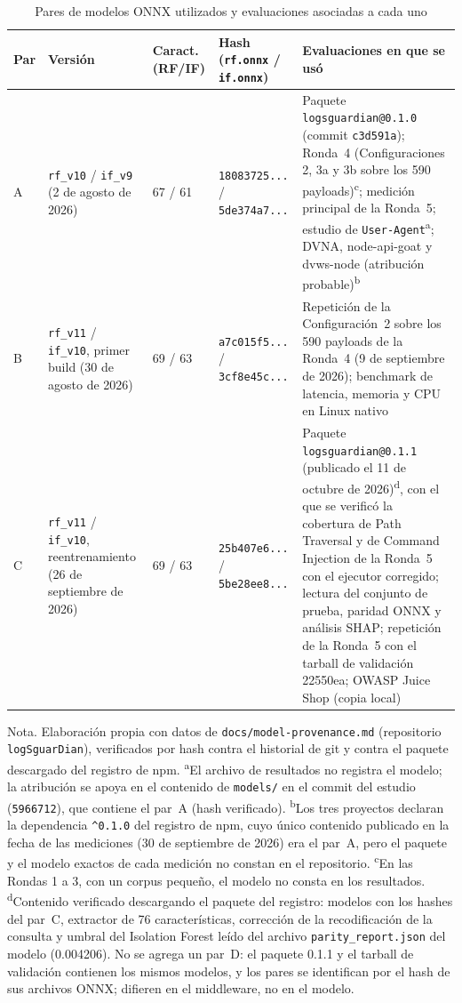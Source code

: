 \begin{table}[H]
\centering
\small
\begin{tabular}{|L{0.9cm}|L{2.6cm}|L{1.4cm}|L{2.6cm}|L{5.2cm}|}
\hline
\textbf{Par} & \textbf{Versión} & \textbf{Caract. (RF/IF)} & \textbf{Hash (\texttt{rf.onnx} / \texttt{if.onnx})} & \textbf{Evaluaciones en que se usó} \\ \hline
A & \texttt{rf\_v10} / \texttt{if\_v9} (2 de agosto de 2026) & 67 / 61 & \texttt{18083725...} / \texttt{5de374a7...} & Paquete \texttt{logsguardian@0.1.0} (commit \texttt{c3d591a}); Ronda~4 (Configuraciones 2, 3a y 3b sobre los 590 payloads)\textsuperscript{c}; medición principal de la Ronda~5; estudio de \texttt{User-Agent}\textsuperscript{a}; DVNA, node-api-goat y dvws-node (atribución probable)\textsuperscript{b} \\ \hline
B & \texttt{rf\_v11} / \texttt{if\_v10}, primer build (30 de agosto de 2026) & 69 / 63 & \texttt{a7c015f5...} / \texttt{3cf8e45c...} & Repetición de la Configuración~2 sobre los 590 payloads de la Ronda~4 (9 de septiembre de 2026); benchmark de latencia, memoria y CPU en Linux nativo \\ \hline
C & \texttt{rf\_v11} / \texttt{if\_v10}, reentrenamiento (26 de septiembre de 2026) & 69 / 63 & \texttt{25b407e6...} / \texttt{5be28ee8...} & Paquete \texttt{logsguardian@0.1.1} (publicado el 11 de octubre de 2026)\textsuperscript{d}, con el que se verificó la cobertura de Path Traversal y de Command Injection de la Ronda~5 con el ejecutor corregido; lectura del conjunto de prueba, paridad ONNX y análisis SHAP; repetición de la Ronda~5 con el tarball de validación 22550ea; OWASP Juice Shop (copia local) \\ \hline
\end{tabular}
\caption[Pares de modelos ONNX y su uso]{Pares de modelos ONNX utilizados y evaluaciones asociadas a cada uno}
\label{tab:pares-modelos}
\end{table}
{\footnotesize Nota. Elaboración propia con datos de \texttt{docs/model-provenance.md} (repositorio
\texttt{logSguarDian}), verificados por hash contra el historial de git y contra el paquete
descargado del registro de npm. \textsuperscript{a}El archivo de resultados no registra el modelo; la
atribución se apoya en el contenido de \texttt{models/} en el commit del estudio (\texttt{5966712}),
que contiene el par~A (hash verificado). \textsuperscript{b}Los tres proyectos declaran la dependencia
\texttt{\^{}0.1.0} del registro de npm, cuyo único contenido publicado en la fecha de las mediciones
(30 de septiembre de 2026) era el par~A, pero el paquete y el modelo exactos de cada medición no
constan en el repositorio. \textsuperscript{c}En las Rondas 1 a 3,
con un corpus pequeño, el modelo no consta en los resultados. \textsuperscript{d}Contenido verificado
descargando el paquete del registro: modelos con los hashes del par~C, extractor de 76
características, corrección de la recodificación de la consulta y umbral del Isolation Forest leído del archivo \texttt{parity\_report.json} del modelo (0.004206). No se agrega un par~D: el paquete 0.1.1 y el tarball
de validación contienen los mismos modelos, y los pares se identifican por el hash de sus archivos
ONNX; difieren en el middleware, no en el modelo.}

